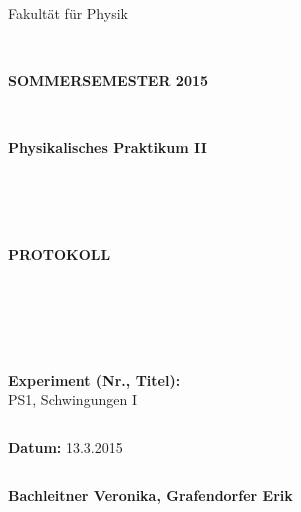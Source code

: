 \documentclass{article}
\begin{document}
\thispagestyle{empty}
			\begin{center}
			\Large{Fakultät für Physik}\\
			\end{center}
\begin{verbatim}


\end{verbatim}
			\begin{center}
			\textbf{\LARGE SOMMERSEMESTER 2015}
			\end{center}
\begin{verbatim}


\end{verbatim}
			\begin{center}
			\textbf{\LARGE{Physikalisches Praktikum II}}
			\end{center}
\begin{verbatim}




\end{verbatim}

			\begin{center}
			\textbf{\LARGE{PROTOKOLL}}
			\end{center}
			
\begin{verbatim}





\end{verbatim}

			\begin{flushleft}
			\textbf{\Large{Experiment (Nr., Titel):}}\\
			\LARGE{PS1, Schwingungen I}	
			\end{flushleft}

\begin{verbatim}

\end{verbatim}	
			\begin{flushleft}
			\textbf{\Large{Datum:}} \Large{13.3.2015}
			\end{flushleft}
			
\begin{verbatim}
\end{verbatim}
		\begin{flushleft}
			\textbf{\Large{Bachleitner Veronika, Grafendorfer Erik}} 
			\end{flushleft}
\end{document}
